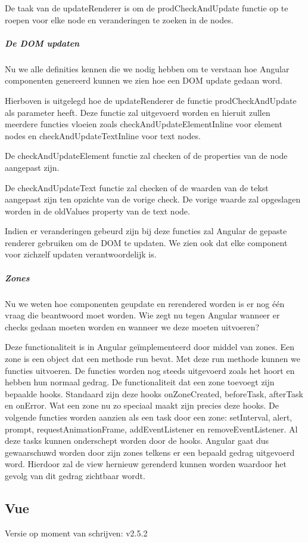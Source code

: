 De taak van de updateRenderer is om de prodCheckAndUpdate functie op te roepen voor elke node en veranderingen te zoeken in de nodes.

\subparagraph{De DOM updaten}
Nu we alle definities kennen die we nodig hebben om te verstaan hoe Angular componenten genereerd kunnen we zien hoe een DOM update gedaan word.

Hierboven is uitgelegd hoe de updateRenderer de functie prodCheckAndUpdate als parameter heeft. Deze functie zal uitgevoerd worden en hieruit zullen meerdere functies vloeien zoals checkAndUpdateElementInline voor element nodes en checkAndUpdateTextInline voor text nodes.

De checkAndUpdateElement functie zal checken of de properties van de node aangepast zijn.

De checkAndUpdateText functie zal checken of de waarden van de tekst aangepast zijn ten opzichte van de vorige check. De vorige waarde zal opgeslagen worden in de oldValues property van de text node.

Indien er veranderingen gebeurd zijn bij deze functies zal Angular de gepaste renderer gebruiken om de DOM te updaten. We zien ook dat elke component voor zichzelf updaten verantwoordelijk is.

\subparagraph{Zones}
Nu we weten hoe componenten geupdate en rerendered worden is er nog één vraag die beantwoord moet worden. Wie zegt nu tegen Angular wanneer er checks gedaan moeten worden en wanneer we deze moeten uitvoeren?

Deze functionaliteit is in Angular geïmplementeerd door middel van zones. Een zone is een object dat een methode run bevat. Met deze run methode kunnen we functies uitvoeren. De functies worden nog steeds uitgevoerd zoals het hoort en hebben hun normaal gedrag. De functionaliteit dat een zone toevoegt zijn bepaalde hooks. Standaard zijn deze hooks onZoneCreated, beforeTask, afterTask en onError. Wat een zone nu zo speciaal maakt zijn precies deze hooks. De volgende functies worden aanzien als een task door een zone: setInterval, alert, prompt, requestAnimationFrame, addEventListener en removeEventListener. Al deze tasks kunnen onderschept worden door de hooks. Angular gaat dus gewaarschuwd worden door zijn zones telkens er een bepaald gedrag uitgevoerd word. Hierdoor zal de view hernieuw gerenderd kunnen worden waardoor het gevolg van dit gedrag zichtbaar wordt.

\subsection{Vue}
\label{sec:JavaScript_Frameworks_Vue}
Versie op moment van schrijven: v2.5.2

